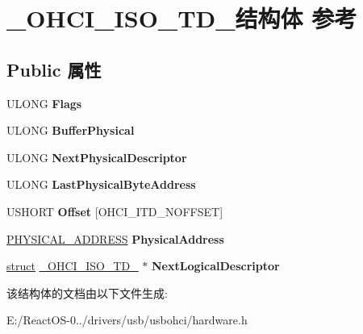 \hypertarget{struct___o_h_c_i___i_s_o___t_d__}{}\section{\+\_\+\+O\+H\+C\+I\+\_\+\+I\+S\+O\+\_\+\+T\+D\+\_\+结构体 参考}
\label{struct___o_h_c_i___i_s_o___t_d__}
\subsection*{Public 属性}
\begin{DoxyCompactItemize}
\item 
\mbox{\label{struct___o_h_c_i___i_s_o___t_d___a1d840aa16fadb310444b36a0ec52c4e7}} 
U\+L\+O\+NG {\bfseries Flags}
\item 
\mbox{\label{struct___o_h_c_i___i_s_o___t_d___ad615b62bd92b7c3e76871cf9d4d3ae6d}} 
U\+L\+O\+NG {\bfseries Buffer\+Physical}
\item 
\mbox{\label{struct___o_h_c_i___i_s_o___t_d___a42373c59d16d3c7cb0dd90017aede78d}} 
U\+L\+O\+NG {\bfseries Next\+Physical\+Descriptor}
\item 
\mbox{\label{struct___o_h_c_i___i_s_o___t_d___a2005e5c2bbf38ba6e385ff876d290f42}} 
U\+L\+O\+NG {\bfseries Last\+Physical\+Byte\+Address}
\item 
\mbox{\label{struct___o_h_c_i___i_s_o___t_d___a701445b6b5f5415c3c53b53f9fa7bd64}} 
U\+S\+H\+O\+RT {\bfseries Offset} \mbox{[}O\+H\+C\+I\+\_\+\+I\+T\+D\+\_\+\+N\+O\+F\+F\+S\+ET\mbox{]}
\item 
\mbox{\label{struct___o_h_c_i___i_s_o___t_d___afed49a008b988a6720ac06db6e4bf712}} 
\hyperlink{union___l_a_r_g_e___i_n_t_e_g_e_r}{P\+H\+Y\+S\+I\+C\+A\+L\+\_\+\+A\+D\+D\+R\+E\+SS} {\bfseries Physical\+Address}
\item 
\mbox{\label{struct___o_h_c_i___i_s_o___t_d___a8c3c47975ee9a0914dbb7d41c05a7485}} 
\hyperlink{interfacestruct}{struct} \hyperlink{struct___o_h_c_i___i_s_o___t_d__}{\+\_\+\+O\+H\+C\+I\+\_\+\+I\+S\+O\+\_\+\+T\+D\+\_\+} $\ast$ {\bfseries Next\+Logical\+Descriptor}
\end{DoxyCompactItemize}


该结构体的文档由以下文件生成\+:\begin{DoxyCompactItemize}
\item 
E\+:/\+React\+O\+S-\/0../drivers/usb/usbohci/hardware.\+h\end{DoxyCompactItemize}
